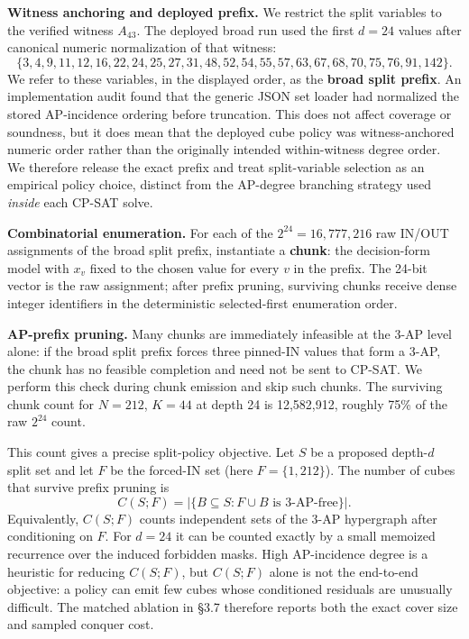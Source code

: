 \textbf{Witness anchoring and deployed prefix.} We restrict the split
variables to the verified witness $A_{43}$. The deployed broad run used the
first $d=24$ values after canonical numeric normalization of that witness:
\[
\{3,4,9,11,12,16,22,24,25,27,31,48,
  52,54,55,57,63,67,68,70,75,76,91,142\}.
\]
We refer to these variables, in the displayed order, as the \textbf{broad
split prefix}. An implementation audit found that the generic JSON set loader
had normalized the stored AP-incidence ordering before truncation. This does
not affect coverage or soundness, but it does mean that the deployed cube
policy was witness-anchored numeric order rather than the originally intended
within-witness degree order. We therefore release the exact prefix and treat
split-variable selection as an empirical policy choice, distinct from the
AP-degree branching strategy used \emph{inside} each CP-SAT solve.

\textbf{Combinatorial enumeration.} For each of the
$2^{24}=16{,}777{,}216$ raw IN/OUT assignments of the broad split prefix,
instantiate a
\textbf{chunk}: the decision-form model with $x_v$ fixed to the chosen
value for every $v$ in the prefix. The 24-bit vector is the raw assignment;
after prefix pruning, surviving chunks receive dense integer identifiers in
the deterministic selected-first enumeration order.

\textbf{AP-prefix pruning.} Many chunks are immediately infeasible at the
3-AP level alone: if the broad split prefix forces three pinned-IN
values that form a 3-AP, the chunk has no feasible completion and
need not be sent to CP-SAT. We perform this check during chunk
emission and skip such chunks. The surviving chunk count for
$N = 212$, $K = 44$ at depth 24 is 12,582,912, roughly 75\% of
the raw $2^{24}$ count.

This count gives a precise split-policy objective. Let $S$ be a proposed
depth-$d$ split set and let $F$ be the forced-IN set (here
$F=\{1,212\}$). The number of cubes that survive prefix pruning is
\[
  C(S;F)=\bigl|\{B\subseteq S: F\cup B\text{ is 3-AP-free}\}\bigr|.
\]
Equivalently, $C(S;F)$ counts independent sets of the 3-AP hypergraph after
conditioning on $F$. For $d=24$ it can be counted exactly by a small
memoized recurrence over the induced forbidden masks. High AP-incidence
degree is a heuristic for reducing $C(S;F)$, but $C(S;F)$ alone is not the
end-to-end objective: a policy can emit few cubes whose conditioned residuals
are unusually difficult. The matched ablation in §3.7 therefore reports both
the exact cover size and sampled conquer cost.

